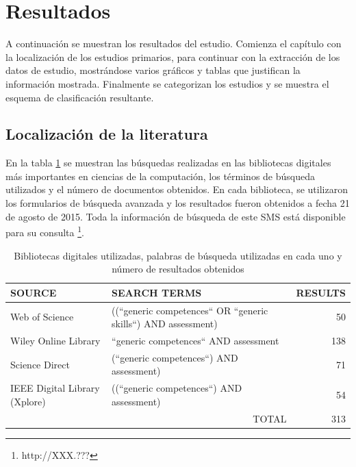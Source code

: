 \section{Resultados}

A continuación se muestran los resultados del estudio. Comienza el capítulo con la localización de los estudios primarios, para continuar con la extracción de los datos de estudio, mostrándose varios gráficos y tablas que justifican la información mostrada. Finalmente se categorizan los estudios y se muestra el esquema de clasificación resultante.

\subsection{Localización de la literatura}

En la tabla \ref{tab:ResumenBusquedaResultados} se muestran las búsquedas realizadas en las bibliotecas digitales más importantes en ciencias de la computación, los términos de búsqueda utilizados y el número de documentos obtenidos. En cada biblioteca, se utilizaron los formularios de búsqueda avanzada y los resultados fueron obtenidos a fecha 21 de agosto de 2015. Toda la información de búsqueda de este SMS está disponible para su consulta \footnote{http://XXX.???}.


\begin{table}
  \begin{center}
  \begin{tabular}{| p{4cm} | p{8cm} | r |}
    \hline
    SOURCE & SEARCH TERMS & RESULTS\\
    \hline
    \hline
    Web of Science & ((``generic competences`` OR ``generic skills``) AND assessment) & 50 \\
    \hline
    Wiley Online Library & ``generic competences`` AND assessment &  138 \\
    \hline
    Science Direct & (``generic competences``) AND assessment) &  71 \\
    \hline
    IEEE Digital Library (Xplore) & ((``generic competences``) AND assessment) & 54 \\
    \hline
    \hline
    \multicolumn{2}{|r|}{TOTAL} & 313\\
    \hline
  \end{tabular}
\end{center}
\caption{Bibliotecas digitales utilizadas, palabras de búsqueda utilizadas en cada uno y número de resultados obtenidos}
\label{tab:ResumenBusquedaResultados}
\end{table} 

